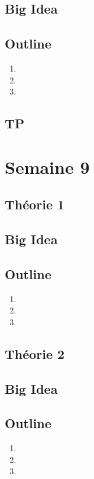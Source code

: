 \documentclass{article}
\begin{document}
\subsection*{Big Idea}
\subsection*{Outline}
\begin{enumerate}
    \item
    \item
    \item
\end{enumerate}
\subsection{TP}

\pagebreak
\section{Semaine 9}
\subsection{Théorie 1}
\subsection*{Big Idea}
\subsection*{Outline}
\begin{enumerate}
    \item
    \item
    \item
\end{enumerate}
\subsection{Théorie 2}
\subsection*{Big Idea}
\subsection*{Outline}
\begin{enumerate}
    \item
    \item
    \item
\end{enumerate}
\end{document}
